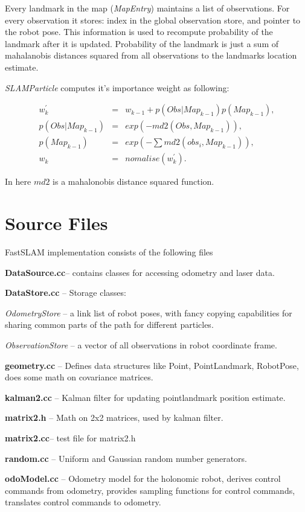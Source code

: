 \documentclass{article}
\begin{document}
Every landmark in the map (\textit{MapEntry}) maintains a list of
observations. For every observation it stores: index in the global
observation store, and pointer to the robot pose. This information is
used to recompute probability of the landmark after it is
updated. Probability of the landmark is just a sum of mahalanobis
distances squared from all observations to the landmarks location
estimate.

\textit{SLAMParticle} computes it's importance weight as following:

\begin{eqnarray}
  w_k^{\prime}    & = & w_{k-1} + p(Obs|Map_{k-1})p(Map_{k-1}), \\
  p(Obs|Map_{k-1})& = & exp(-md2(Obs, Map_{k-1})),     \\
  p(Map_{k-1})    & = & exp(-\sum{md2(obs_i, Map_{k-1})}), \\
  w_k & = & nomalise(w_k^{\prime}).
\end{eqnarray}

In here $md2$ is a mahalonobis distance squared function.

\section{Source Files}

FastSLAM implementation consists of the following files

\textbf{ DataSource.cc}-- contains classes for accessing odometry and 
laser data.

\textbf{ DataStore.cc }-- Storage classes:

\textit{OdometryStore} -- a link list of robot poses, with
fancy copying capabilities for sharing common parts of the path for
different particles.

\textit{ObservationStore} -- a vector of all observations in robot
coordinate frame.

\textbf{ geometry.cc }-- Defines data structures like Point,
PointLandmark, RobotPose, does some math on covariance matrices.

\textbf{ kalman2.cc }-- Kalman filter for updating pointlandmark
position estimate.

\textbf{ matrix2.h }-- Math on 2x2 matrices, used by kalman filter.

\textbf{ matrix2.cc}-- test file for matrix2.h

\textbf{ random.cc }-- Uniform and Gaussian random number generators.

\textbf{ odoModel.cc }-- Odometry model for the holonomic robot,
derives control commands from odometry, provides sampling functions
for control commands, translates control commands to odometry. 
\end{document}
